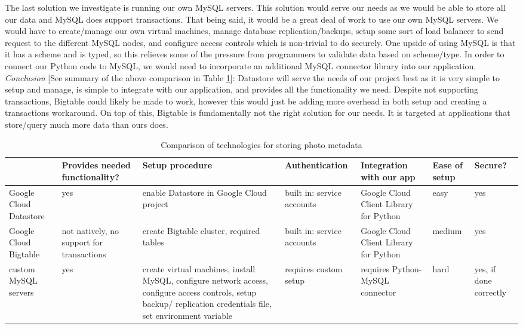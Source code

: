 \documentclass[10pt, onecolumn, draftclsnofoot, letterpaper, compsoc]{IEEEtran}
\begin{document}
The last solution we investigate is running our own MySQL servers. This solution 
would serve our needs as we would be able to store all our data and MySQL 
does support transactions. That being said, it would be a great deal of work to 
use our own MySQL servers. We would have to create/manage our own virtual machines, 
manage database replication/backups, setup some sort of load balancer to send 
request to the different MySQL nodes, and configure access controls which is 
non-trivial to do securely. One upside of using MySQL is that it has a scheme 
and is typed, so this relieves some of the pressure from programmers to 
validate data based on scheme/type. In order to connect our Python code to MySQL,
we would need to incorporate an additional MySQL connector library into our 
application\cite{mysql}. \\

\textit{Conclusion} [See summary of the above comparison in Table \ref{table:bret2}]:
Datastore will serve the needs of our project best as it is 
very simple to setup and manage, is simple to integrate with our application, 
and provides all the functionality we need. Despite not supporting transactions, 
Bigtable could likely be made to work, however this would just be adding more 
overhead in both setup and creating a transactions workaround. On top of this, 
Bigtable is fundamentally not the right solution for our needs. It is 
targeted at applications that store/query much more data than ours does. \\

\begin{table}[h]
\centering
\caption{Comparison of technologies for storing photo metadata}
\begin{tabular}{|p{1.8cm}|p{1.4cm}|p{3cm}|p{1.8cm}|p{1.8cm}|p{1.8cm}|p{1cm}|}
\cline{4-4}
\hline

 & Provides needed functionality? & Setup procedure & Authentication 
 & Integration with our app & Ease of setup & Secure? \\ \hline

Google Cloud Datastore & yes & enable Datastore in Google Cloud project
& built in: service accounts & Google Cloud Client Library for Python
& easy & yes \\ \hline

Google Cloud Bigtable & not natively, no support for transactions &
create Bigtable cluster, required tables & built in: service accounts 
& Google Cloud Client Library for Python & medium & yes \\ \hline

custom MySQL servers & yes & create virtual machines, install MySQL, 
configure network access, configure access controls, setup backup/
replication credentials file, set environment variable & requires custom setup 
& requires Python-MySQL connector & hard & yes, if done correctly \\ \hline

\end{tabular}
\label{table:bret2}
\end{table}
\end{document}

